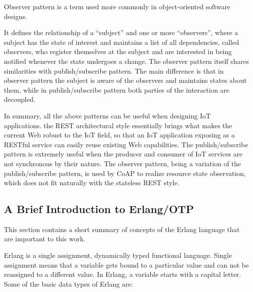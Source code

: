 Observer pattern \autocite{gamma1995design} is a term used more commonly in object-oriented software designs. 

It defines the relationship of a ``subject'' and one or more ``observers'', where a subject has the state of interest and maintains a list of all dependencies, called observers, who register themselves at the subject and are interested in being notified whenever the state undergoes a change. The observer pattern itself shares similarities with publish/subscribe pattern. The main difference is that in observer pattern the subject is aware of the observers and maintains states about them, while in publish/subscribe pattern both parties of the interaction are decoupled.

In summary, all the above patterns can be useful when designing IoT applications. the REST architectural style essentially brings what makes the current Web robust to the IoT field, so that an IoT application exposing as a RESTful service can easily reuse existing Web capabilities. The publish/subscribe pattern is extremely useful when the producer and consumer of IoT services are not synchronous by their nature. The observer pattern, being a variation of the publish/subscribe pattern, is used by CoAP to realize resource state observation, which does not fit naturally with the stateless REST style.

\subsection{A Brief Introduction to Erlang/OTP}


This section contains a short summary of concepts of the Erlang language that are important to this work. 

Erlang is a single assignment, dynamically typed functional language. Single assignment means that a variable gets bound to a particular value and can not be reassigned to a different value. In Erlang, a variable starts with a capital letter. Some of the basic data types of Erlang are:

